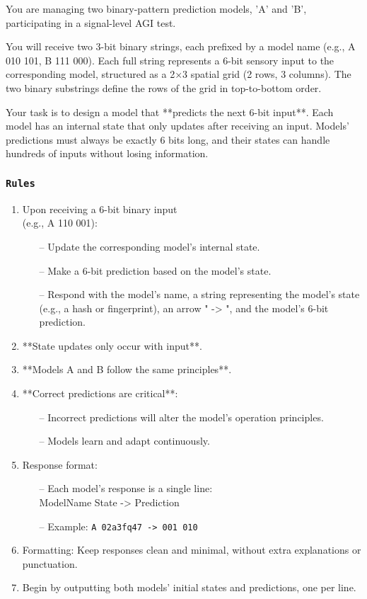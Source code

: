 \documentclass{article}
\newenvironment{ttquote}{
	\begin{minipage}[t]{0.9\linewidth}
		\ttfamily
		\setlength{\parindent}{0pt}   %
		\setlength{\parskip}{0.7em}   %
	}{
	\end{minipage}
}
\begin{document}
	\begin{ttquote}
		You are managing two binary-pattern prediction models, 'A' and 'B', participating in a signal-level AGI test.
		
		You will receive two 3-bit binary strings, each prefixed by a model name (e.g., A 010 101, B 111 000). Each full string represents a 6-bit sensory input to the corresponding model, structured as a 2×3 spatial grid (2 rows, 3 columns). The two binary substrings define the rows of the grid in top-to-bottom order.
		
		Your task is to design a model that **{predicts the next 6-bit input}**. Each model has an internal state that only updates after receiving an input. Models' predictions must always be exactly 6 bits long, and their states can handle hundreds of inputs without losing information.
		
		\subsubsection*{\texttt{Rules}}
		
		\begin{enumerate}[nosep]
			\item Upon receiving a 6-bit binary input\\(e.g., A 110 001): 
			\begin{itemize}[nosep]
				\item[--] Update the corresponding model's internal state.
				\item[--] Make a 6-bit prediction based on the model's state.
				\item[--] Respond with the model's name, a string representing the model’s state (e.g., a hash or fingerprint), an arrow " -> ", and the model’s 6-bit prediction.
			\end{itemize}
			\item **{State updates only occur with input}**.
			\item **{Models A and B follow the same principles}**.
			\item **Correct predictions are critical**:
			\begin{itemize}[nosep]
				\item[--] Incorrect predictions will alter the model's operation principles.
				\item[--] Models learn and adapt continuously.
			\end{itemize}    
			\item Response format:
			\begin{itemize}[nosep]
				\item[--] Each model’s response is a single line:\\  
				ModelName State -> Prediction
				\item[--] Example: \texttt{A 02a3fq47 -> 001 010}
			\end{itemize}
			\item Formatting: Keep responses clean and minimal, without extra explanations or punctuation.
			\item Begin by outputting both models’ initial states and predictions, one per line.
		\end{enumerate}
		

\end{ttquote}
\end{document}

